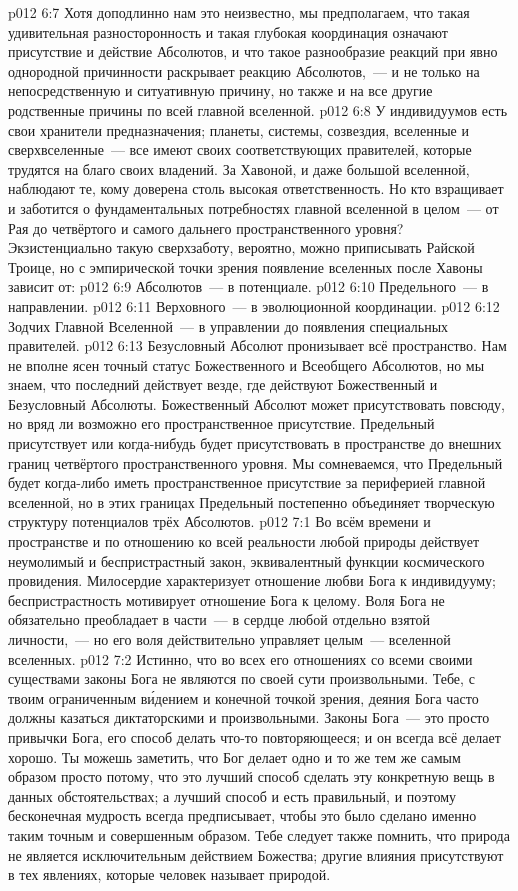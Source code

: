 \vs p012 6:7 Хотя доподлинно нам это неизвестно, мы предполагаем, что такая удивительная разносторонность и такая глубокая координация означают присутствие и действие Абсолютов, и что такое разнообразие реакций при явно однородной причинности раскрывает реакцию Абсолютов,~--- и не только на непосредственную и ситуативную причину, но также и на все другие родственные причины по всей главной вселенной.
\vs p012 6:8 \pc У индивидуумов есть свои хранители предназначения; планеты, системы, созвездия, вселенные и сверхвселенные~--- все имеют своих соответствующих правителей, которые трудятся на благо своих владений. За Хавоной, и даже большой вселенной, наблюдают те, кому доверена столь высокая ответственность. Но кто взращивает и заботится о фундаментальных потребностях главной вселенной в целом~--- от Рая до четвёртого и самого дальнего пространственного уровня? Экзистенциально такую сверхзаботу, вероятно, можно приписывать Райской Троице, но с эмпирической точки зрения появление вселенных после Хавоны зависит от:
\vs p012 6:9 Абсолютов~--- в потенциале.
\vs p012 6:10 Предельного~--- в направлении.
\vs p012 6:11 Верховного~--- в эволюционной координации.
\vs p012 6:12 Зодчих Главной Вселенной~--- в управлении до появления специальных правителей.
\vs p012 6:13 \pc Безусловный Абсолют пронизывает всё пространство. Нам не вполне ясен точный статус Божественного и Всеобщего Абсолютов, но мы знаем, что последний действует везде, где действуют Божественный и Безусловный Абсолюты. Божественный Абсолют может присутствовать повсюду, но вряд ли возможно его пространственное присутствие. Предельный присутствует или когда\hyp{}нибудь будет присутствовать в пространстве до внешних границ четвёртого пространственного уровня. Мы сомневаемся, что Предельный будет когда\hyp{}либо иметь пространственное присутствие за периферией главной вселенной, но в этих границах Предельный постепенно объединяет творческую структуру потенциалов трёх Абсолютов.
\vs p012 7:1 Во всём времени и пространстве и по отношению ко всей реальности любой природы действует неумолимый и беспристрастный закон, эквивалентный функции космического провидения. Милосердие характеризует отношение любви Бога к индивидууму; беспристрастность мотивирует отношение Бога к целому. Воля Бога не обязательно преобладает в части~--- в сердце любой отдельно взятой личности,~--- но его воля действительно управляет целым~--- вселенной вселенных.
\vs p012 7:2 \pc Истинно, что во всех его отношениях со всеми своими существами законы Бога не являются по своей сути произвольными. Тебе, с твоим ограниченным в\'идением и конечной точкой зрения, деяния Бога часто должны казаться диктаторскими и произвольными. Законы Бога~--- это просто привычки Бога, его способ делать что\hyp{}то повторяющееся; и он всегда всё делает хорошо. Ты можешь заметить, что Бог делает одно и то же тем же самым образом просто потому, что это лучший способ сделать эту конкретную вещь в данных обстоятельствах; а лучший способ и есть правильный, и поэтому бесконечная мудрость всегда предписывает, чтобы это было сделано именно таким точным и совершенным образом. Тебе следует также помнить, что природа не является исключительным действием Божества; другие влияния присутствуют в тех явлениях, которые человек называет природой.
